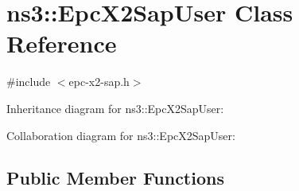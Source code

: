 \hypertarget{classns3_1_1EpcX2SapUser}{}\section{ns3\+:\+:Epc\+X2\+Sap\+User Class Reference}
\label{classns3_1_1EpcX2SapUser}


{\ttfamily \#include $<$epc-\/x2-\/sap.\+h$>$}



Inheritance diagram for ns3\+:\+:Epc\+X2\+Sap\+User\+:


Collaboration diagram for ns3\+:\+:Epc\+X2\+Sap\+User\+:
\subsection*{Public Member Functions}
